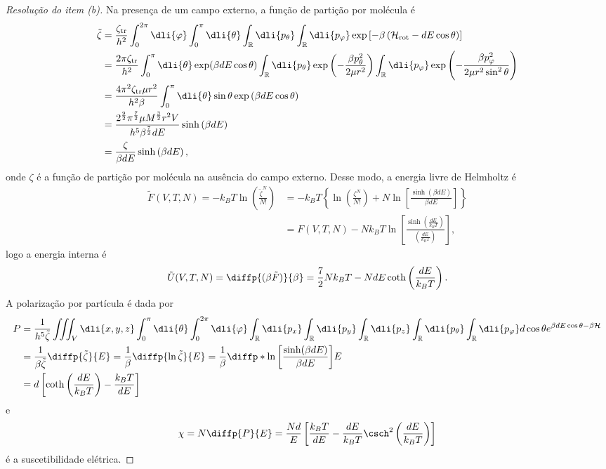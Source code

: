 \begin{proof}[Resolução do item (b)]
    Na presença de um campo externo, a função de partição por molécula é
    \begin{align*}
        \tilde{\zeta} &= \frac{\zeta_{\mathrm{tr}}}{h^2}\int_0^{2\pi} \dli{\varphi} \int_0^\pi \dli{\theta} \int_{\mathbb{R}}\dli{p_\theta} \int_{\mathbb{R}}\dli{p_{\varphi}} \exp\left[-\beta\left(\mathcal{H}_{\mathrm{rot}}-d E \cos\theta\right)\right]\\
              &= \frac{2\pi\zeta_{\mathrm{tr}}}{h^2} \int_0^\pi \dli{\theta} \exp(\beta d E \cos\theta) \int_{\mathbb{R}}\dli{p_\theta} \exp\left(-\frac{\beta p_\theta^2}{2\mu r^2}\right) \int_{\mathbb{R}}\dli{p_{\varphi}}\exp\left(-\frac{\beta p_{\varphi}^2}{2\mu r^2 \sin^2\theta}\right)\\
              &= \frac{4\pi^2 \zeta_{\mathrm{tr}} \mu r^2}{h^2 \beta} \int_0^\pi \dli{\theta} \sin\theta \exp\left(\beta d E \cos\theta\right)\\
              &= \frac{2^{\frac92}\pi^{\frac72} \mu M^{\frac32}r^2V}{h^5 \beta^{\frac72} d E} \sinh\left(\beta d E\right)\\
              &= \frac{\zeta}{\beta dE} \sinh\left(\beta dE\right),
    \end{align*}
    onde \(\zeta\) é a função de partição por molécula na ausência do campo externo. Desse modo, a energia livre de Helmholtz é
    \begin{align*}
        \tilde{F}(V, T, N) = -k_BT \ln \left(\frac{\tilde{\zeta}^N}{N!}\right)
        &= -k_B T \left\{\ln\left(\frac{\zeta^N}{N!}\right) + N\ln\left[\frac{\sinh\left(\beta d E\right)}{\beta d E}\right]\right\}\\
        &= F(V, T, N) - N k_B T\ln\left[\frac{\sinh\left(\frac{d E}{k_BT}\right)}{\left(\frac{d E}{k_B T}\right)}\right],
    \end{align*}
    logo a energia interna é
    \begin{equation*}
        \tilde{U}(V, T, N) = \diffp{(\beta \tilde{F})}{\beta} = \frac72 N k_B T - N d E\coth\left(\frac{dE}{k_BT}\right).
    \end{equation*}
    A polarização por partícula é dada por
    \begin{align*}
        P &= \frac{1}{h^5 \tilde{\zeta}} \iiint_V \dli{x,y,z} \int_0^\pi \dli{\theta}\int_0^{2\pi} \dli{\varphi} \int_{\mathbb{R}} \dli{p_x} \int_{\mathbb{R}} \dli{p_y} \int_{\mathbb{R}} \dli{p_z} \int_{\mathbb{R}} \dli{p_\theta} \int_{\mathbb{R}} \dli{p_{\varphi}} d \cos\theta e^{\beta dE\cos\theta-\beta \mathcal{H}}\\
          &= \frac{1}{\beta \tilde{\zeta}} \diffp{\tilde{\zeta}}{E} = \frac1\beta\diffp{\ln \tilde{\zeta}}{E} = \frac{1}{\beta} \diffp*{\ln\left[\frac{\sinh( \beta d E)}{\beta dE}\right]}{E}\\
          &= d\left[\coth\left(\frac{d E}{k_B T}\right) - \frac{k_BT}{d E}\right]
    \end{align*}
    e
    \begin{equation*}
        \chi = N\diffp{P}{E} = \frac{Nd}{E}\left[\frac{k_B T}{dE} - \frac{dE}{k_BT}\csch^2\left(\frac{dE}{k_B T}\right)\right]
    \end{equation*}
    é a suscetibilidade elétrica.
\end{proof}
